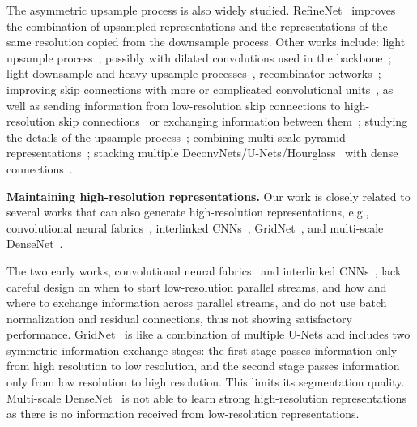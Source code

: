 \documentclass[10pt,journal,compsoc]{IEEEtran}
\begin{document}
The asymmetric upsample process is also widely studied.
RefineNet~\cite{LinMSR17} improves the combination 
of upsampled representations and
the representations of the same resolution
copied from the downsample process.
Other works include: 
light upsample process~\cite{BulatT16, ChenWPZYS17,XiaoWW18, LinDGHHB17},
possibly with dilated convolutions used in the backbone~\cite{InsafutdinovPAA16, PishchulinITAAG16, LifshitzFU16};
light downsample and heavy upsample processes~\cite{ValleBVB18}, 
recombinator networks~\cite{HonariYVP16}; 
improving skip connections with more or complicated convolutional units~\cite{PengZYLS17, ZhangZPXS18, IslamRBW17}, as well as sending information from low-resolution skip connections to high-resolution skip connections~\cite{ZhouSTL18}
or exchanging information between them~\cite{GuoDXZ18};
studying the details of the upsample process~\cite{WojnaUGSCFF17};
combining multi-scale pyramid representations~\cite{ChenZPSA18, XiaoLZJS18};
stacking multiple DeconvNets/U-Nets/Hourglass~\cite{FuLWL17, Wu0YWC018}
with dense connections~\cite{TangPGWZM18}.




\vspace{.1cm}
\noindent\textbf{Maintaining high-resolution representations.}
Our work is closely related to several works
that can also generate high-resolution representations,
e.g., convolutional neural fabrics~\cite{SaxenaV16}, interlinked CNNs~\cite{ZhouHZ15},
GridNet~\cite{FourureEFMT017}, 
and multi-scale DenseNet~\cite{HuangCLWMW17}.

The two early works, convolutional neural fabrics~\cite{SaxenaV16} 
and interlinked CNNs~\cite{ZhouHZ15},
lack careful design 
on when to start low-resolution parallel streams,
and how and where to exchange information across parallel streams,
and do not use batch normalization and residual connections,
thus not showing satisfactory performance.
GridNet~\cite{FourureEFMT017} 
is like a combination of multiple U-Nets
and includes two symmetric information exchange stages:
the first stage passes information 
only 
from high resolution
to low resolution,
and the second stage passes information
only from low resolution to high resolution.
This limits its segmentation quality.
Multi-scale DenseNet~\cite{HuangCLWMW17} is not able to learn 
strong high-resolution representations
as there is no information received from low-resolution representations.
\end{document}

